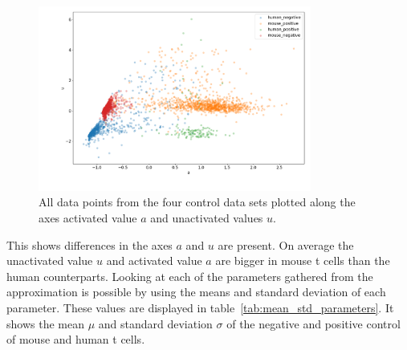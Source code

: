\begin{figure}[h]
	\centering
	\includegraphics[width=0.8\textwidth]{fig/all_cells}
	
	\caption{All data points from the four control data sets plotted along the axes activated value $a$ and unactivated values $u$.}
	\label{fig:all_cells}
\end{figure}

This shows differences in the axes $a$ and $u$ are present. On average the unactivated value $u$ and activated value $a$ are bigger in mouse t cells than the human counterparts. Looking at each of the parameters gathered from the approximation is possible by using the means and standard deviation of each parameter. These values are displayed in table~\ref{tab:mean_std_parameters}. It shows the mean $\mu$ and standard deviation $\sigma$ of the negative and positive control of mouse and human t cells.

